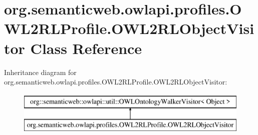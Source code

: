 \hypertarget{classorg_1_1semanticweb_1_1owlapi_1_1profiles_1_1_o_w_l2_r_l_profile_1_1_o_w_l2_r_l_object_visitor}{\section{org.\-semanticweb.\-owlapi.\-profiles.\-O\-W\-L2\-R\-L\-Profile.\-O\-W\-L2\-R\-L\-Object\-Visitor Class Reference}
\label{classorg_1_1semanticweb_1_1owlapi_1_1profiles_1_1_o_w_l2_r_l_profile_1_1_o_w_l2_r_l_object_visitor}
}
Inheritance diagram for org.\-semanticweb.\-owlapi.\-profiles.\-O\-W\-L2\-R\-L\-Profile.\-O\-W\-L2\-R\-L\-Object\-Visitor\-:\begin{figure}[H]
\begin{center}
\leavevmode
\includegraphics[height=2.000000cm]{classorg_1_1semanticweb_1_1owlapi_1_1profiles_1_1_o_w_l2_r_l_profile_1_1_o_w_l2_r_l_object_visitor}
\end{center}
\end{figure}
